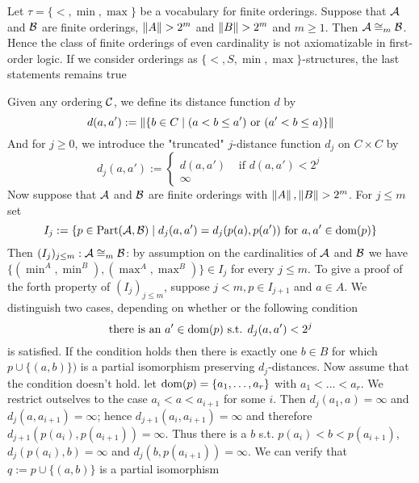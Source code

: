 \documentclass[11pt]{article}
\def \Part {\text{Part}}
\begin{document}
\begin{examplle}[]
Let \(\tau=\{<,\min,\max\}\) be a vocabulary for finite orderings. Suppose that \(\mathcal{A}\) and
\(\mathcal{B}\) are finite orderings, \(\left\lVert A\right\rVert>2^m\) and \(\left\lVert B\right\rVert>2^m\) and \(m\ge1\). Then
\(\mathcal{A}\cong_m\mathcal{B}\). Hence the class of finite orderings of even cardinality is not
axiomatizable in first-order logic. If we consider orderings as \(\{<,S,\min,\max\}\)-structures,
the last statements remains true

Given any ordering \(\mathcal{C}\), we define its distance function \(d\) by
\begin{equation*}
d(a,a'):=\left\lVert\{b\in C\mid(a<b\le a')\text{ or }(a'<b\le a)\}\right\rVert
\end{equation*}
And for \(j\ge0\), we introduce the "truncated" \(j\)-distance function \(d_j\) on \(C\times C\)
by
\begin{equation*}
d_j(a,a'):=
\begin{cases}
d(a,a')&\text{ if }d(a,a')<2^j\\
\infty
\end{cases}
\end{equation*}
Now suppose that \(\mathcal{A}\) and \(\mathcal{B}\) are finite orderings with \(\left\lVert A\right\rVert,\left\lVert B\right\rVert>2^m\). For
\(j\le m\) set
\begin{equation*}
I_j:=\{p\in\Part(\cala,\calb)\mid d_j(a,a')=d_j(p(a),p(a'))\text{ for }a,a'\in\dom(p)\}
\end{equation*}
Then \((I_j)_{j\le m}:\mathcal{A}\cong_m\mathcal{B}\): by assumption on the cardinalities of \(\mathcal{A}\) and
\(\mathcal{B}\) we have \(\{(\min^A,\min^B),(\max^A,\max^B)\}\in I_j\) for every \(j\le m\). To give a
proof of the forth property of \((I_j)_{j\le m}\), suppose \(j<m,p\in I_{j+1}\) and \(a\in A\).
We distinguish two cases, depending on whether or the following condition
\begin{equation*}
\text{there is an }a'\in\operatorname{dom}(p)\text{ s.t. }d_j(a,a')<2^j
\end{equation*}
is satisfied. If the condition holds then there is exactly one \(b\in B\) for which
\(p\cup\{(a,b)\})\) is a partial isomorphism preserving \(d_j\)-distances. Now assume that the
condition doesn't hold. let \(\operatorname{dom}(p)=\{a_1,\dots,a_r\}\) with \(a_1<\dots<a_r\). We restrict
outselves to the case \(a_i<a<a_{i+1}\) for some \(i\). Then \(d_j(a_1,a)=\infty\) and
\(d_j(a,a_{i+1})=\infty\); hence \(d_{j+1}(a_i,a_{i+1})=\infty\) and therefore
\(d_{j+1}(p(a_i),p(a_{i+1}))=\infty\). Thus there is a \(b\) s.t. \(p(a_i)<b<p(a_{i+1})\),
\(d_j(p(a_i),b)=\infty\) and \(d_j(b,p(a_{i+1}))=\infty\). We can verify that
\(q:=p\cup\{(a,b)\}\) is a partial isomorphism
\end{examplle}
\end{document}

